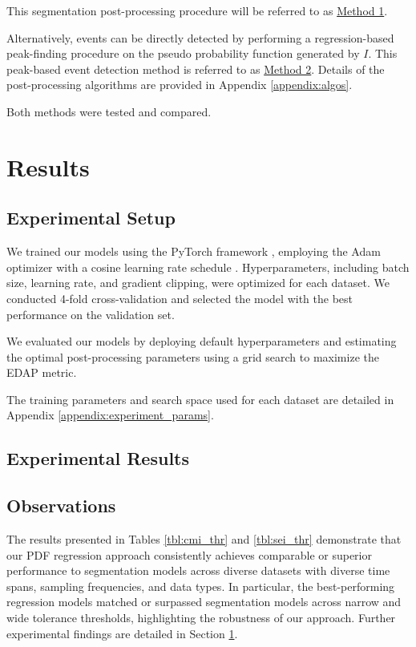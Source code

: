 \documentclass{article}
\begin{document}
This segmentation post-processing procedure will be referred to as \hyperref[seg:m1]{Method 1}.

Alternatively, events can be directly detected by performing a regression-based peak-finding procedure on the pseudo probability function generated by $I$. This peak-based event detection method is referred to as \hyperref[seg:m2]{Method 2}. Details of the post-processing algorithms are provided in Appendix \ref{appendix:algos}.

Both methods were tested and compared.

\section{Results}
\label{section:results}

\subsection{Experimental Setup}

We trained our models using the PyTorch framework \citep{ansel2024}, employing the Adam optimizer \citep{kingma15} with a cosine learning rate schedule \citep{loshchilov2017}. Hyperparameters, including batch size, learning rate, and gradient clipping, were optimized for each dataset. We conducted 4-fold cross-validation and selected the model with the best performance on the validation set.

We evaluated our models by deploying default hyperparameters and estimating the optimal post-processing parameters using a grid search to maximize the EDAP metric. 

The training parameters and search space used for each dataset are detailed in Appendix \ref{appendix:experiment_params}.

\subsection{Experimental Results}

\subsection{Observations}

The results presented in Tables \ref{tbl:cmi_thr} and \ref{tbl:sei_thr} demonstrate that our PDF regression approach consistently achieves comparable or superior performance to segmentation models across diverse datasets with diverse time spans, sampling frequencies, and data types. In particular, the best-performing regression models matched or surpassed segmentation models across narrow and wide tolerance thresholds, highlighting the robustness of our approach. Further experimental findings are detailed in Section \ref{section:results}.
\end{document}
